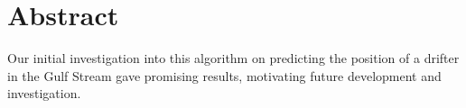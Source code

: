 \chapter{Abstract}
\label{ch:abstract}



Our initial investigation into this algorithm on predicting the position of a drifter in the Gulf Stream gave promising results, motivating future development and investigation.
